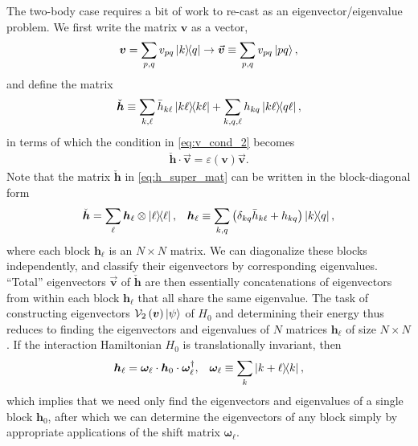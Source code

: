 \documentclass[nofootinbib,notitlepage,11pt]{revtex4-2}
\newcommand{\p}[1]{\left(#1\right)} %
\renewcommand{\c}{\cdot} %
\newcommand{\m}{\bm} %
\renewcommand{\v}{\vec} %
\newcommand{\1}{\mathds{1}}
\newcommand{\e}{\varepsilon}
\newcommand{\V}{\mathcal{V}}
\begin{document}
The two-body case requires a bit of work to re-cast as an
eigenvector/eigenvalue problem.  We first write the matrix $\m v$ as a
vector,
\begin{align}
  \m v = \sum_{p,q} v_{pq} \op{k}{q}
  \to \v{\m v} \equiv \sum_{p,q} v_{pq} \ket{pq},
\end{align}
and define the matrix
\begin{align}
  \check{\m h}
  \equiv \sum_{k,\ell} \bar h_{k\ell} \op{k\ell}
  + \sum_{k,q,\ell} h_{kq} \op{k\ell}{q\ell},
  \label{eq:h_super_mat}
\end{align}
in terms of which the condition in \eqref{eq:v_cond_2} becomes
\begin{align}
  \check{\m h} \c \v{\m v} = \e\p{\m v} \v{\m v}.
\end{align}
Note that the matrix $\check{\m h}$ in \eqref{eq:h_super_mat} can be
written in the block-diagonal form
\begin{align}
  \check{\m h} = \sum_\ell \m h_\ell \otimes \op{\ell},
  &&
  \m h_\ell
  \equiv \sum_{k,q}\p{\delta_{kq} \bar h_{k\ell} + h_{kq}} \op{k}{q},
\end{align}
where each block $\m h_\ell$ is an $N\times N$ matrix.  We can
diagonalize these blocks independently, and classify their
eigenvectors by corresponding eigenvalues.  ``Total'' eigenvectors
$\v{\m v}$ of $\check{\m h}$ are then essentially concatenations of
eigenvectors from within each block $\m h_\ell$ that all share the
same eigenvalue.  The task of constructing eigenvectors
$\V_2\p{\m v}\ket\psi$ of $H_0$ and determining their energy thus
reduces to finding the eigenvectors and eigenvalues of $N$ matrices
$\m h_\ell$ of size $N\times N$.  If the interaction Hamiltonian $H_0$
is translationally invariant, then
\begin{align}
  \m h_{\ell} = \m\omega_\ell \c \m h_0 \c \m\omega_\ell^\dag,
  &&
  \m\omega_\ell \equiv \sum_k \op{k+\ell}{k},
\end{align}
which implies that we need only find the eigenvectors and eigenvalues
of a single block $\m h_0$, after which we can determine the
eigenvectors of any block simply by appropriate applications of the
shift matrix $\m\omega_\ell$.


\end{document}
